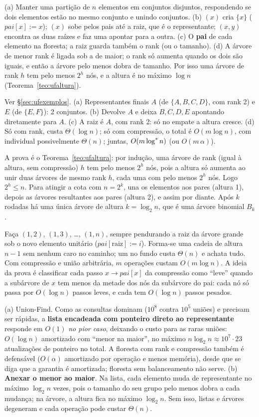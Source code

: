  (a) Manter uma partição de $n$ elementos em conjuntos disjuntos, respondendo se dois elementos estão no mesmo conjunto e unindo conjuntos. (b) \MakeSet$(x)$ cria $\{x\}$ ($pai[x]:=x$); \Find$(x)$ sobe pelos pais até a raiz, que é o representante; \Union$(x,y)$ encontra as duas raízes e faz uma apontar para a outra. (c) O \textbf{pai} de cada elemento na floresta; a raiz guarda também o rank (ou o tamanho). (d) A árvore de menor rank é ligada sob a de maior; o rank só aumenta quando os dois são iguais, e então a árvore pelo menos dobra de tamanho. Por isso uma árvore de rank $h$ tem pelo menos $2^h$ nós, e a altura é no máximo $\log n$ (Teorema~\ref{teo:ufaltura}).

 Ver §\ref{sec:ufexemplos}. (a) Representantes finais $A$ (de $\{A,B,C,D\}$, com rank 2) e $E$ (de $\{E,F\}$): 2 conjuntos. (b) Devolve $A$ e deixa $B,C,D,E$ apontando diretamente para $A$. (c) A raiz é $A$, com rank 2: só no empate a altura cresce. (d) Só com rank, \Find{} custa $\Theta(\log n)$; só com compressão, o total é $O(m\log n)$, com \Find{} individual possivelmente $\Theta(n)$; juntas, $O(m\log^{*} n)$ (ou $O(m\,\alpha)$).

 A prova é o Teorema~\ref{teo:ufaltura}: por indução, uma árvore de rank (igual à altura, sem compressão) $h$ tem pelo menos $2^h$ nós, pois a altura só aumenta ao unir duas árvores de mesmo rank $h$, cada uma com pelo menos $2^h$ nós. Logo $2^h\le n$. Para atingir a cota com $n=2^k$, una os elementos aos pares (altura 1), depois as árvores resultantes aos pares (altura 2), e assim por diante. Após $k$ rodadas há uma única árvore de altura $k=\log_2n$, que é uma árvore binomial $B_k$.

 Faça \Union$(1,2)$, \Union$(1,3)$, \dots, \Union$(1,n)$, sempre pendurando a raiz da árvore grande sob o novo elemento unitário ($pai[\text{raiz}]:=i$). Forma-se uma cadeia de altura $n-1$ sem nenhum \Find{} caro no caminho; um \Find{} no fundo custa $\Theta(n)$ e achata tudo. Com compressão e união arbitrária, $m$ operações custam $O(m\log n)$. A ideia da prova é classificar cada passo $x\to pai[x]$ da compressão como ``leve'' quando a subárvore de $x$ tem menos da metade dos nós da subárvore do pai: cada nó só passa por $O(\log n)$ passos leves, e cada \Find{} tem $O(\log n)$ passos pesados.

 (a) Union-Find. Como as consultas dominam ($10^8$ contra $10^5$ uniões) e precisam ser rápidas, a \textbf{lista encadeada com ponteiro direto ao representante} responde \Find{} em $O(1)$ \emph{no pior caso}, deixando o custo para as raras uniões: $O(\log n)$ amortizado com ``menor na maior'', no máximo $n\log_2n\approx10^7\cdot23$ atualizações de ponteiro no total. A floresta com rank e compressão também é defensável ($O(\alpha)$ amortizado por operação e menos memória), desde que se diga que a garantia é amortizada; floresta sem balanceamento não serve. (b) \textbf{Anexar o menor ao maior}. Na lista, cada elemento muda de representante no máximo $\log_2n$ vezes, pois o tamanho do seu grupo pelo menos dobra a cada mudança; na árvore, a altura fica no máximo $\log_2n$. Sem isso, listas e árvores degeneram e cada operação pode custar $\Theta(n)$.

